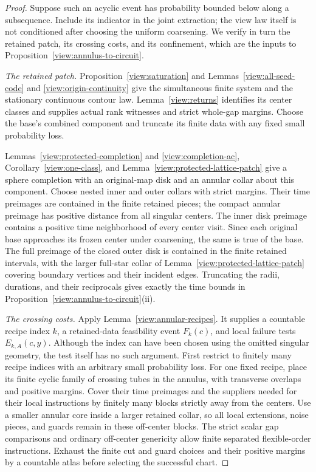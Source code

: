\begin{proof}
Suppose such an acyclic event has probability bounded below along a
subsequence.  Include its indicator in the joint extraction; the view
law itself is not conditioned after choosing the uniform coarsening.
We verify in turn the retained patch, its crossing costs, and its
confinement, which are the inputs to
Proposition~\ref{view:annulus-to-circuit}.

\smallskip\noindent\emph{The retained patch.}
Proposition~\ref{view:saturation} and
Lemmas~\ref{view:all-seed-code} and \ref{view:origin-continuity}
give the simultaneous finite system
and the stationary continuous contour law.  Lemma~\ref{view:returns}
identifies its center classes and supplies actual rank witnesses and
strict whole-gap margins.  Choose the base's combined component and
truncate its finite data with any fixed small probability loss.

Lemmas~\ref{view:protected-completion} and
\ref{view:completion-ac}, Corollary~\ref{view:one-class}, and
Lemma~\ref{view:protected-lattice-patch} give a sphere completion with an
original-map disk and an annular collar about this component.  Choose
nested inner and outer collars with strict margins.  Their time
preimages are contained in the finite retained pieces; the compact
annular preimage has positive distance from all singular centers.
The inner disk preimage contains a positive time neighborhood of every
center visit.  Since each original base approaches its frozen center
under coarsening, the same is true of the base.  The full preimage of
the closed outer disk is contained in the finite retained intervals,
with the larger full-star collar of
Lemma~\ref{view:protected-lattice-patch} covering boundary vertices and
their incident edges.  Truncating the radii,
durations, and their reciprocals gives exactly the time bounds in
Proposition~\ref{view:annulus-to-circuit}(ii).

\smallskip\noindent\emph{The crossing costs.}
Apply Lemma~\ref{view:annular-recipes}.  It supplies a countable
recipe index $k$, a retained-data feasibility event $F_k(c)$, and local
failure tests $E_{k,A}(c,y)$.  Although the index can have been chosen
using the omitted singular geometry, the test itself has no such
argument.  First restrict to finitely many recipe indices with an
arbitrary small probability loss.  For one fixed recipe, place its
finite cyclic family of crossing tubes in the annulus,
with transverse overlaps and positive margins.  Cover their time
preimages and the suppliers needed for their local instructions by
finitely many blocks strictly away from the centers.  Use a smaller
annular core inside a larger retained collar, so all local extensions,
noise pieces, and guards remain in these off-center blocks.  The strict
scalar gap comparisons and ordinary off-center genericity allow finite
separated flexible-order instructions.  Exhaust the finite cut and guard
choices and their positive margins by a countable atlas before selecting
the successful chart.


\end{proof}
